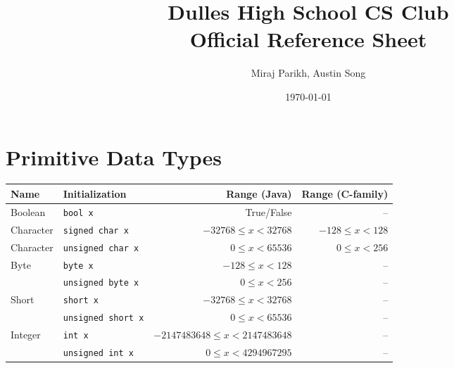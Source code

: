 \documentclass[11pt]{article}
\title{Dulles High School CS Club\\Official Reference Sheet}
\date{\today}
\author{Miraj Parikh, Austin Song}
\begin{document}

{\let\newpage\relax\maketitle} %

\renewcommand{\arraystretch}{1.25} %
\section{Primitive Data Types}
\begin{center}\begin{tabular}{llrr}\toprule
  Name            & Initialization              & Range (Java) & Range (C-family) \\\midrule
  Boolean         & \lstinline|bool x|          & True/False & --\\\midrule
  Character & \lstinline|signed char x|   & \(-32768 \leq x < 32768\) & \(-128 \leq x < 128\) \\ 
  Character & \lstinline|unsigned char x|          & \(0 \leq x < 65536\) & \(0 \leq x < 256\) \\
  Byte            & \lstinline|byte x|          & \(-128 \leq x < 128\) & -- \\
                  & \lstinline|unsigned byte x| & \(0 \leq x < 256\) & -- \\
  Short           & \lstinline|short x|         & \(-32768 \leq x < 32768\) & -- \\
                  & \lstinline|unsigned short x|& \(0 \leq x < 65536\) & -- \\
  Integer         & \lstinline|int x|           & \(-2147483648 \leq x < 2147483648\) & -- \\
                  & \lstinline|unsigned int x|  & \(0 \leq x < 4294967295\) & -- \\
\end{tabular}\end{center}

\setlength{\tabcolsep}{1pt}
\renewcommand{\arraystretch}{1}
\end{document}
